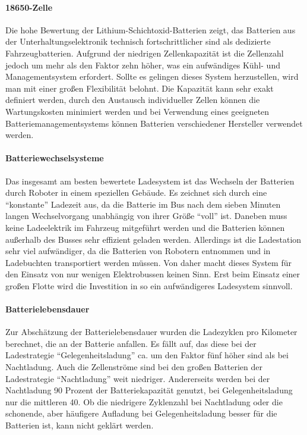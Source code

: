 \paragraph{18650-Zelle} Die hohe Bewertung der Lithium-Schichtoxid-Batterien zeigt, das Batterien aus der Unterhaltungselektronik technisch fortschrittlicher sind als dedizierte Fahrzeugbatterien. Aufgrund der niedrigen Zellenkapazität ist die Zellenzahl jedoch um mehr als den Faktor zehn höher, was ein aufwändiges Kühl- und Managementsystem erfordert. Sollte es gelingen dieses System herzustellen, wird man mit einer großen Flexibilität belohnt. Die Kapazität kann sehr exakt definiert werden, durch den Austausch individueller Zellen können die Wartungskosten minimiert werden und bei Verwendung eines geeigneten Batteriemanagementsystems können Batterien verschiedener Hersteller verwendet werden.

\paragraph{Batteriewechselsysteme} Das insgesamt am besten bewertete Ladesystem ist das Wechseln der Batterien durch Roboter in einem speziellen Gebäude. Es zeichnet sich durch eine "`konstante"' Ladezeit aus, da die Batterie im Bus nach dem sieben Minuten langen Wechselvorgang unabhängig von ihrer Größe "`voll"' ist. Daneben muss keine Ladeelektrik im Fahrzeug mitgeführt werden und die Batterien können außerhalb des Busses sehr effizient geladen werden. Allerdings ist die Ladestation sehr viel aufwändiger, da die Batterien  von Robotern entnommen und in Ladebuchten transportiert werden müssen. Von daher macht dieses System für den Einsatz von nur wenigen Elektrobussen keinen Sinn. Erst beim Einsatz einer großen Flotte wird die Investition in so ein aufwändigeres Ladesystem sinnvoll.

\paragraph{Batterielebensdauer} Zur Abschätzung der Batterielebensdauer wurden die Ladezyklen pro Kilometer berechnet, die an der Batterie anfallen. Es fällt auf, das diese bei der Ladestrategie "`Gelegenheitsladung"' ca. um den Faktor fünf höher sind als bei Nachtladung. Auch die Zellenströme sind bei den großen Batterien der Ladestrategie "`Nachtladung"' weit niedriger. Andererseits werden bei der Nachtladung 90 Prozent der Batteriekapazität genutzt, bei Gelegenheitsladung nur die mittleren 40. Ob die niedrigere Zyklenzahl bei Nachtladung oder die schonende, aber häufigere Aufladung bei Gelegenheitsladung besser für die Batterien ist, kann nicht geklärt werden.

